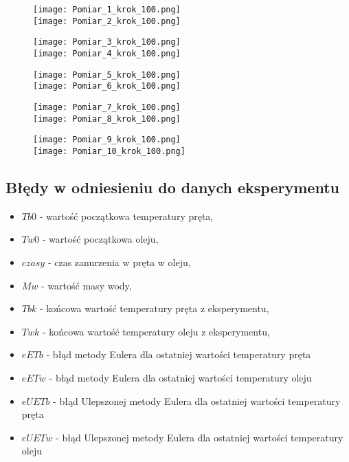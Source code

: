 \documentclass[varwidth,12pt,a4paper]{article}
\begin{document}
\begin{figure}[H]
    \texttt{[image: Pomiar\_1\_krok\_100.png]} \\
    \texttt{[image: Pomiar\_2\_krok\_100.png]} \\
\end{figure}
\begin{figure}[H]
    \texttt{[image: Pomiar\_3\_krok\_100.png]} \\
    \texttt{[image: Pomiar\_4\_krok\_100.png]} \\
\end{figure}
\begin{figure}[H]
    \texttt{[image: Pomiar\_5\_krok\_100.png]} \\
    \texttt{[image: Pomiar\_6\_krok\_100.png]} \\
\end{figure}
\begin{figure}[H]
    \texttt{[image: Pomiar\_7\_krok\_100.png]} \\
    \texttt{[image: Pomiar\_8\_krok\_100.png]} \\
\end{figure}
\begin{figure}[H]
    \texttt{[image: Pomiar\_9\_krok\_100.png]} \\
    \texttt{[image: Pomiar\_10\_krok\_100.png]} 
\end{figure}

\subsection{Błędy w odniesieniu do danych eksperymentu}

\begin{table}[H]
    \centering{}
\end{table}

\begin{itemize}
    \item $Tb0$ - wartość początkowa temperatury pręta,
    \item $Tw0$ - wartość początkowa oleju,
    \item $czasy$ - czas zanurzenia w pręta w oleju,
    \item $Mw$ - wartość masy wody,
    \item $Tbk$ - końcowa wartość temperatury pręta z eksperymentu,
    \item $Twk$ - końcowa wartość temperatury oleju z eksperymentu,
    \item $eETb$ - błąd metody Eulera dla ostatniej wartości temperatury pręta
    \item $eETw$ - błąd metody Eulera dla ostatniej wartości temperatury oleju
    \item $eUETb$ - błąd Ulepszonej metody Eulera dla ostatniej wartości temperatury pręta
    \item $eUETw$ - błąd Ulepszonej metody Eulera dla ostatniej wartości temperatury oleju
\end{itemize}
\end{document}
